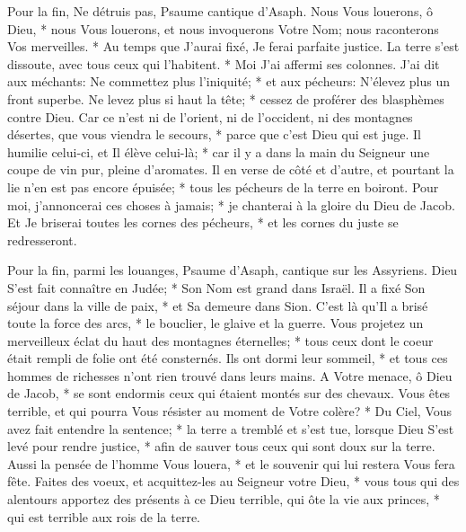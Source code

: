 Pour la fin, Ne détruis pas, Psaume cantique d'Asaph.
Nous Vous louerons, ô Dieu, * nous Vous louerons, et nous invoquerons Votre Nom; nous raconterons Vos merveilles. *
Au temps que J'aurai fixé, Je ferai parfaite justice.
La terre s'est dissoute, avec tous ceux qui l'habitent. * Moi J'ai affermi ses colonnes.
J'ai dit aux méchants: Ne commettez plus l'iniquité; * et aux pécheurs: N'élevez plus un front superbe.
Ne levez plus si haut la tête; * cessez de proférer des blasphèmes contre Dieu.
Car ce n'est ni de l'orient, ni de l'occident, ni des montagnes désertes, que vous viendra le secours, *
parce que c'est Dieu qui est juge. Il humilie celui-ci, et Il élève celui-là; *
car il y a dans la main du Seigneur une coupe de vin pur, pleine d'aromates. Il en verse de côté et d'autre, et pourtant la lie n'en est pas encore épuisée; * tous les pécheurs de la terre en boiront.
Pour moi, j'annoncerai ces choses à jamais; * je chanterai à la gloire du Dieu de Jacob.
Et Je briserai toutes les cornes des pécheurs, * et les cornes du juste se redresseront.

Pour la fin, parmi les louanges, Psaume d'Asaph, cantique sur les Assyriens.
Dieu S'est fait connaître en Judée; * Son Nom est grand dans Israël.
Il a fixé Son séjour dans la ville de paix, * et Sa demeure dans Sion.
C'est là qu'Il a brisé toute la force des arcs, * le bouclier, le glaive et la guerre.
Vous projetez un merveilleux éclat du haut des montagnes éternelles; *
tous ceux dont le coeur était rempli de folie ont été consternés. Ils ont dormi leur sommeil, * et tous ces hommes de richesses n'ont rien trouvé dans leurs mains.
A Votre menace, ô Dieu de Jacob, * se sont endormis ceux qui étaient montés sur des chevaux.
Vous êtes terrible, et qui pourra Vous résister au moment de Votre colère? *
Du Ciel, Vous avez fait entendre la sentence; * la terre a tremblé et s'est tue,
lorsque Dieu S'est levé pour rendre justice, * afin de sauver tous ceux qui sont doux sur la terre.
Aussi la pensée de l'homme Vous louera, * et le souvenir qui lui restera Vous fera fête.
Faites des voeux, et acquittez-les au Seigneur votre Dieu, * vous tous qui des alentours apportez des présents à ce Dieu terrible,
qui ôte la vie aux princes, * qui est terrible aux rois de la terre.

